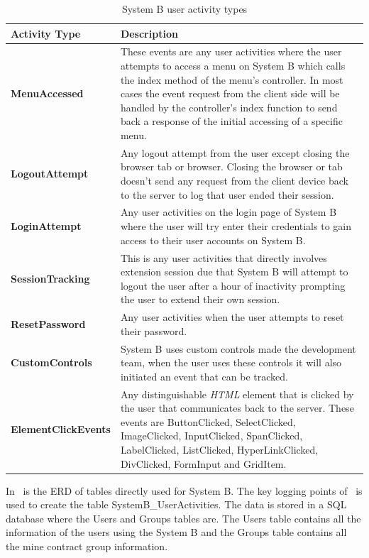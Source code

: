 \begin{table}[!htb]
	\centering
	\small
	\caption[System B user activity types]
	{System B user activity types}
	\label{tbl:Ch2_SystemB_ActivityTypes}
	\begin{tabularx}{\textwidth}{|l|X|}
		\hline \textbf{Activity Type} & \textbf{Description} \\
		\hline \textbf{MenuAccessed} & These events are any user activities where the user attempts to access a menu on System B which calls the index method of the menu's controller. In most cases the event request from the client side will be handled by the controller's index function to send back a response of the initial accessing of a specific menu. \\
		\hline \textbf{LogoutAttempt} & Any logout attempt from the user except closing the browser tab or browser. Closing the browser or tab doesn't send any request from the client device back to the server to log that user ended their session. \\
		\hline \textbf{LoginAttempt} & Any user activities on the login page of System B where the user will try enter their credentials to gain access to their user accounts on System B.\\
		\hline \textbf{SessionTracking} & This is any user activities that directly involves extension session due that System B will attempt to logout the user after a hour of inactivity prompting the user to extend their own session.\\
		\hline \textbf{ResetPassword} & Any user activities when the user attempts to reset their password. \\
		\hline \textbf{CustomControls} & System B uses custom controls made the development team, when the user uses these controls it will also initiated an event that can be tracked. \\ 
		\hline \textbf{ElementClickEvents} & Any distinguishable \emph{HTML} element that is clicked by the user that communicates back to the server. These events are ButtonClicked, SelectClicked, ImageClicked, InputClicked, SpanClicked, LabelClicked, ListClicked, HyperLinkClicked, DivClicked, FormInput and GridItem.\\
		\hline
	\end{tabularx}
\end{table}

In~ is the ERD of tables directly used for System B. The key logging points of~ is used to create the table SystemB\_UserActivities. The data is stored in a SQL database where the Users and Groups tables are. The Users table contains all the information of the users using the System B and the Groups table contains all the mine contract group information. 

